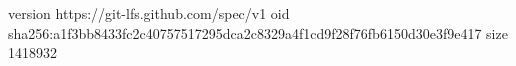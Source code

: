 version https://git-lfs.github.com/spec/v1
oid sha256:a1f3bb8433fc2c40757517295dca2c8329a4f1cd9f28f76fb6150d30e3f9e417
size 1418932
